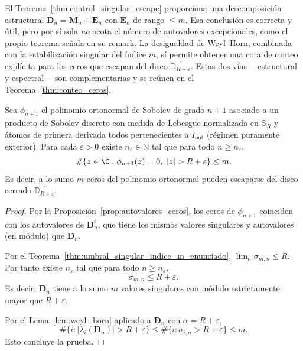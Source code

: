 \begin{rmk}\label{rem:weyl_horn_vs_control}
	El Teorema~\ref{thm:control_singular_escape} proporciona una descomposición estructural $\mathbf D_n=\mathbf M_n+\mathbf E_n$ con $\mathbf E_n$ de rango $\le m$. Esa conclusión es correcta y útil, pero por sí sola \emph{no} acota el número de autovalores excepcionales, como el propio teorema señala en su remark. La desigualdad de Weyl--Horn, combinada con la estabilización singular del índice $m$, sí permite obtener una cota de conteo explícita para los ceros que escapan del disco $\overline{\mathbb D_{R+\varepsilon}}$. Estas dos vías ---estructural y espectral--- son complementarias y se reúnen en el Teorema~\ref{thm:conteo_ceros}.
\end{rmk}

\begin{thm}\label{thm:conteo_ceros}
	Sea $\phi_{n+1}$ el polinomio ortonormal de Sobolev de grado $n+1$
	asociado a un producto de Sobolev discreto con medida de Lebesgue normalizada en $\mathbb S_R$ y
	átomos de primera derivada todos pertenecientes a $I_{\mathrm{out}}$ (régimen puramente exterior). Para cada $\varepsilon>0$ existe $n_\varepsilon\in\mathbb N$
	tal que para todo $n\ge n_\varepsilon$,
	\[
		\#\{z\in\C:\phi_{n+1}(z)=0,\ |z|>R+\varepsilon\}\le m.
	\]
	Es decir, a lo sumo $m$ ceros del polinomio ortonormal pueden escaparse del
	disco cerrado $\overline{\mathbb D_{R+\varepsilon}}$.
\end{thm}

\begin{proof}
	Por la Proposición~\ref{prop:autovalores_ceros}, los ceros de
	$\phi_{n+1}$ coinciden con los autovalores de $\mathbf D_n^t$, que tiene
	los mismos valores singulares y autovalores (en módulo) que $\mathbf D_n$.

	Por el Teorema~\ref{thm:umbral_singular_indice_m_enunciado}, $\lim_n\sigma_{m,n}\le R$.
	Por tanto existe $n_\varepsilon$ tal que para todo $n\ge n_\varepsilon$,
	\[
		\sigma_{m,n}\le R+\varepsilon.
	\]
	Es decir, $\mathbf D_n$ tiene a lo sumo $m$ valores singulares con módulo
	estrictamente mayor que $R+\varepsilon$.

	Por el Lema~\ref{lem:weyl_horn} aplicado a $\mathbf D_n$ con $\alpha=R+\varepsilon$,
	\[
		\#\{i:|\lambda_i(\mathbf D_n)|>R+\varepsilon\}
		\le
		\#\{i:\sigma_{i,n}>R+\varepsilon\}\le m.
	\]
	Esto concluye la prueba.
\end{proof}


